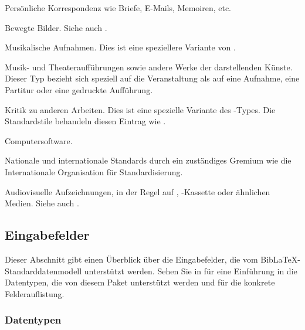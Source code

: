 \documentclass{ltxdockit}[2011/03/25]
\newcommand*{\biblatex}{BibLaTeX\xspace}
\begin{document}
\begin{typelist}

Persönliche Korrespondenz wie Briefe, E-Mails, Memoiren, etc. 


Bewegte Bilder. Siehe auch .


Musikalische Aufnahmen. Dies ist eine speziellere Variante von .


Musik- und Theateraufführungen sowie andere Werke der darstellenden Künste.
Dieser Typ bezieht sich speziell auf die Veranstaltung als auf eine Aufnahme, eine
Partitur oder eine gedruckte Aufführung. 


Kritik zu anderen Arbeiten. Dies ist eine spezielle Variante des
-Types. Die Standardstile behandeln diesen Eintrag wie
.


Computersoftware. 


Nationale und internationale Standards durch ein zuständiges Gremium wie
die
Internationale Organisation für Standardisierung. 


Audiovisuelle Aufzeichnungen, in der Regel auf , -Kassette
oder ähnlichen Medien. Siehe auch . 

\end{typelist}

\subsection{Eingabefelder} \label{bib:fld}

Dieser Abschnitt gibt einen Überblick über die Eingabefelder, die vom
\biblatex-Standarddatenmodell unterstützt werden. Sehen Sie in  
für eine
Einführung in die Datentypen, die von diesem Paket unterstützt werden und
 für die konkrete Felderauflistung.

\subsubsection{Datentypen} \label{bib:fld:typ}
\end{document}

